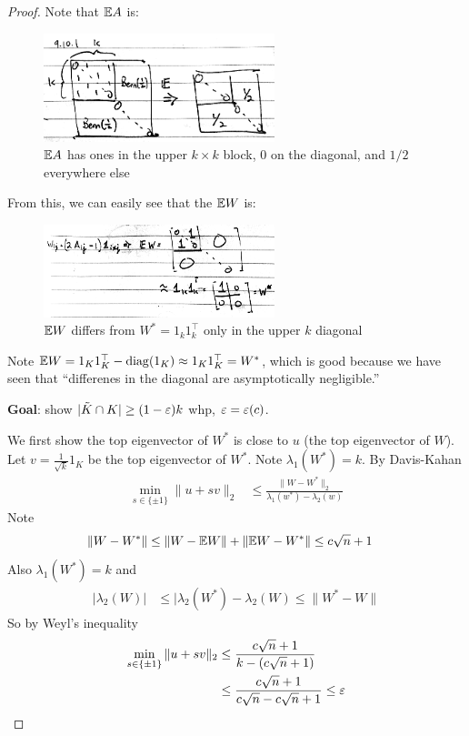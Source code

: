 \begin{proof}
    Note that $\mathbb{E} A$ is:
    \begin{figure}[H]
        \centering
        \includegraphics[width=0.6\textwidth]{figures/9-10-1.png}
        \caption{$\mathbb{E} A$ has ones in the upper $k \times k$ block,
            $0$ on the diagonal, and $1/2$ everywhere else}
    \end{figure}
    
    From this, we can easily see that the $\mathbb{E} W$ is:
    \begin{figure}[H]
        \centering
        \includegraphics[width=0.6\textwidth]{figures/9-10-2.png}
        \caption{$\mathbb{E} W$ differs from $W^* = 1_k 1_k^\top$ only in the upper $k$ diagonal}
    \end{figure}
    Note $\mathbb{E} W = 1_K 1_K^\top - \operatorname{diag}(1_K) \approx 1_K 1_K^\top = W^*$, which
    is good because we have seen that ``differenes in the diagonal are asymptotically negligible.'' 
    
    \textbf{Goal}: show $\lvert \tilde{K} \cap K \rvert \geq (1 - \varepsilon) k$ whp, $\varepsilon = \varepsilon(c)$.
    
    We first show the top eigenvector of $W^*$ is close
    to $u$ (the top eigenvector of $W$).
    Let $v = \frac{1}{\sqrt{k}} 1_K$ be the top eigenvector of $W^*$.
    Note $\lambda_1(W^*) = k$.
    By Davis-Kahan
    \begin{align}
        \min_{s \in \{\pm 1\}} \|u + s v\|_2
        &\leq \frac{\|W - W^*\|_{2}}{\lambda_1(w^*) - \lambda_2(w)}
    \end{align}
    Note
    \begin{align}
        \|W - W^*\|
        &\leq \|W - \mathbb{E} W\| + \|\mathbb{E} W - W^* \|
        \leq c \sqrt{n} + 1
    \end{align}
    Also $\lambda_1(W^*) = k$ and
    \begin{align}
        \lvert \lambda_2(W) \rvert
        &\leq \lvert \lambda_2(W^*) - \lambda_2(W)
        \leq \|W^* - W\|
    \end{align}
    So by Weyl's inequality
    \begin{align}
        \min_{s \in \{\pm 1\}} \|u + s v\|_2
        &\leq \frac{c \sqrt{n} + 1}{ k - (c \sqrt{n} + 1)} \\
        &\leq \frac{c \sqrt{n} + 1}{c \sqrt{n} - c \sqrt{n} + 1}
        \leq \varepsilon
    \end{align}
        

\end{proof}
